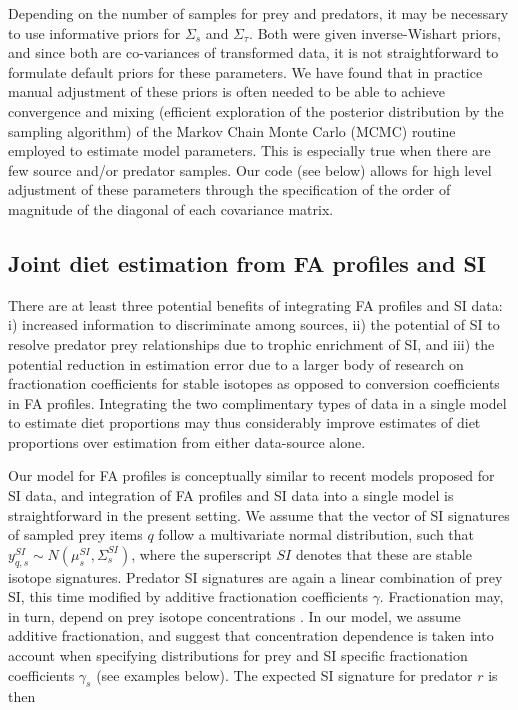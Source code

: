 \documentclass[fleqn,10pt]{wlpeerj}
\begin{document}
Depending on the number of samples for prey and predators, it
may be necessary to use informative priors for $\Sigma_{s}$ and
$\Sigma_{\tau}$. Both were given inverse-Wishart priors, and since both are co-variances of transformed data, it is
not straightforward to formulate default priors for these parameters. We have found that in practice manual adjustment of these priors
is often needed to be able to achieve convergence and mixing
(efficient exploration of the posterior distribution by the sampling
algorithm) of the Markov Chain Monte Carlo (MCMC) routine employed to estimate
model parameters. This is especially true when there are few source and/or predator samples. Our code (see below) allows for high level adjustment of these parameters through
the specification of the order of magnitude of the diagonal of each
covariance matrix. 

\subsection*{Joint diet estimation from FA profiles and SI}
There are at least three potential benefits of integrating FA profiles and SI
data: i) increased information to discriminate among sources, ii) the
potential of SI to resolve predator prey relationships due to trophic
enrichment of SI, and iii) the potential reduction in estimation error
due to a larger body of research on fractionation coefficients for stable
isotopes as opposed to conversion coefficients in FA profiles. Integrating the two complimentary types of data
in a single model to estimate diet proportions may thus considerably
improve estimates of diet proportions over estimation from either
data-source alone.

Our model for FA profiles is conceptually similar to recent models proposed for SI data, and
integration of FA profiles and SI data into a single model is straightforward
in the present setting. We assume that the vector of SI signatures of
sampled prey
items $q$ follow a multivariate normal distribution, such that
$y_{q,s}^{SI} \sim N(\mu_s^{SI},\Sigma_s^{SI})$, where the superscript
$SI$ denotes that these are stable isotope signatures. Predator SI
signatures are again a linear combination of prey SI, this time
modified by additive fractionation coefficients
$\gamma$. Fractionation may, in turn, depend on prey isotope concentrations
\citep{hussey_rescaling_2014,caut_variation_2009}. In our model, we
assume additive fractionation, and suggest that concentration
dependence is taken into account when specifying distributions for
prey and SI specific fractionation coefficients $\gamma_s$ (see
examples below). The expected SI signature for predator $r$ is then
\end{document}
